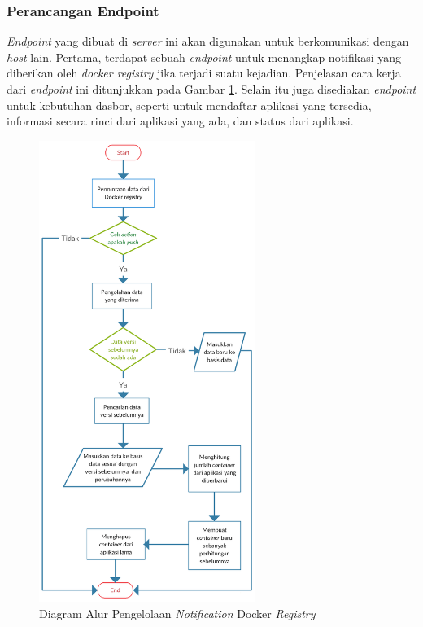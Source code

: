             \subsubsection{Perancangan Endpoint}
            	\textit{Endpoint} yang dibuat di \textit{server} ini akan digunakan untuk berkomunikasi dengan \textit{host} lain. Pertama, terdapat sebuah \textit{endpoint} untuk menangkap notifikasi yang diberikan oleh \textit{docker registry} jika terjadi suatu kejadian. Penjelasan cara kerja dari \textit{endpoint} ini ditunjukkan pada Gambar \ref{endpointdockerregistry}. Selain itu juga disediakan \textit{endpoint} untuk kebutuhan dasbor, seperti untuk mendaftar aplikasi yang tersedia, informasi secara rinci dari aplikasi yang ada, dan status dari aplikasi.
            \begin{figure}[H]
				\centering
				\includegraphics[width=7cm,height=15cm]{Images/C-3/endpointdockerregistry.png}
				\caption{Diagram Alur Pengelolaan \textit{Notification} Docker \textit{Registry}}
				\label{endpointdockerregistry}
			\end{figure}
                
